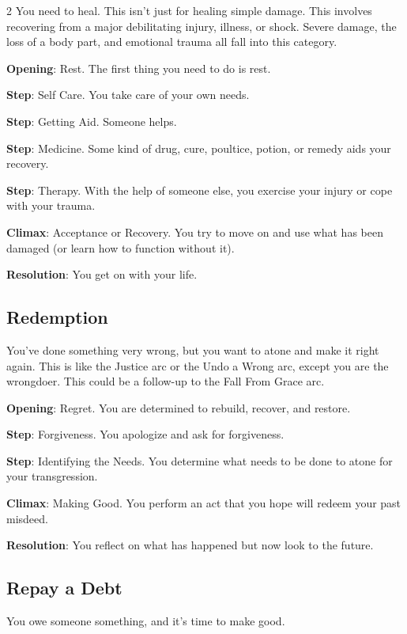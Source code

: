 \begin{multicols}{2}
You need to heal. This isn’t just for healing simple damage. This involves recovering from a major debilitating injury, illness, or shock. Severe damage, the loss of a body part, and emotional trauma all fall into this category. 

\textbf{Opening}: Rest. The first thing you need to do is rest.

\textbf{Step}: Self Care. You take care of your own needs.

\textbf{Step}: Getting Aid. Someone helps.

\textbf{Step}: Medicine. Some kind of drug, cure, poultice, potion, or remedy aids your recovery.

\textbf{Step}: Therapy. With the help of someone else, you exercise your injury or cope with your trauma.

\textbf{Climax}: Acceptance or Recovery. You try to move on and use what has been damaged (or learn how to function without it). 

\textbf{Resolution}: You get on with your life.

\subsection{Redemption}

You’ve done something very wrong, but you want to atone and make it right again. This is like the Justice arc or the Undo a Wrong arc, except you are the wrongdoer. This could be a follow-up to the Fall From Grace arc.

\textbf{Opening}: Regret. You are determined to rebuild, recover, and restore.

\textbf{Step}: Forgiveness. You apologize and ask for forgiveness.

\textbf{Step}: Identifying the Needs. You determine what needs to be done to atone for your transgression.

\textbf{Climax}: Making Good. You perform an act that you hope will redeem your past misdeed.

\textbf{Resolution}: You reflect on what has happened but now look to the future.

\subsection{Repay a Debt}

You owe someone something, and it’s time to make good.


\end{multicols}
